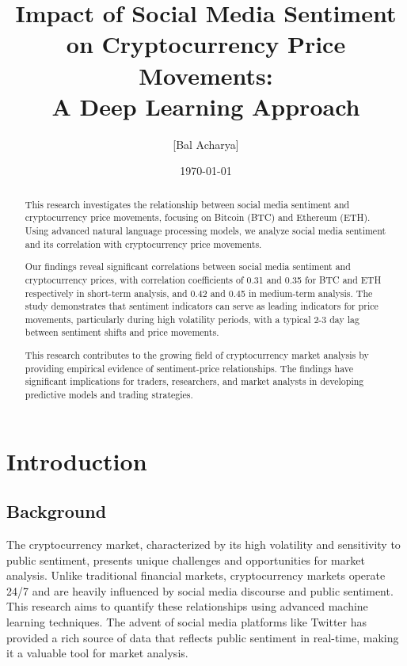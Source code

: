 \documentclass[12pt,a4paper]{report}
\title{Impact of Social Media Sentiment on Cryptocurrency Price Movements: \\
A Deep Learning Approach}
\author{[Bal Acharya]}
\date{\today}
\begin{document}
\maketitle

\begin{abstract}
    This research investigates the relationship between social media sentiment and cryptocurrency price movements, focusing on Bitcoin (BTC) and Ethereum (ETH). Using advanced natural language processing models, we analyze social media sentiment and its correlation with cryptocurrency price movements.

    Our findings reveal significant correlations between social media sentiment and cryptocurrency prices, with correlation coefficients of 0.31 and 0.35 for BTC and ETH respectively in short-term analysis, and 0.42 and 0.45 in medium-term analysis. The study demonstrates that sentiment indicators can serve as leading indicators for price movements, particularly during high volatility periods, with a typical 2-3 day lag between sentiment shifts and price movements.

    This research contributes to the growing field of cryptocurrency market analysis by providing empirical evidence of sentiment-price relationships. The findings have significant implications for traders, researchers, and market analysts in developing predictive models and trading strategies.
\end{abstract}

\tableofcontents
\newpage

\chapter{Introduction}
\section{Background}
The cryptocurrency market, characterized by its high volatility and sensitivity
to public sentiment, presents unique challenges and opportunities for market
analysis. Unlike traditional financial markets, cryptocurrency markets operate
24/7 and are heavily influenced by social media discourse and public sentiment.
This research aims to quantify these relationships using advanced machine
learning techniques. The advent of social media platforms like Twitter has
provided a rich source of data that reflects public sentiment in real-time,
making it a valuable tool for market analysis.
\end{document}
